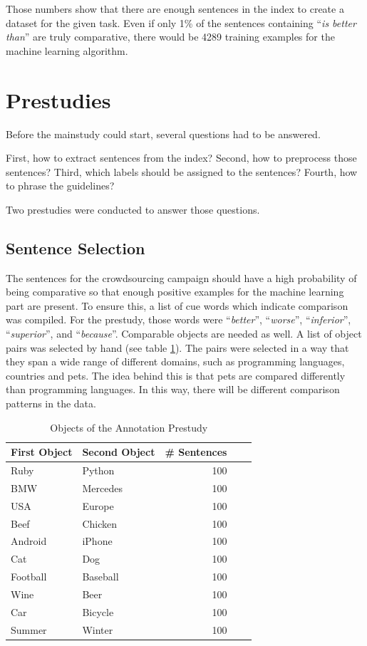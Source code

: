 Those numbers show that there are enough sentences in the index to create a dataset for the given task. Even if only 1\% of the sentences containing \enquote{\emph{is better than}} are truly comparative, there would be 4289 training examples for the machine learning algorithm.


\section{Prestudies}
Before the mainstudy could start, several questions had to be answered.

First, how to extract sentences from the index? Second, how to preprocess those sentences? Third, which labels should be assigned to the sentences? Fourth, how to phrase the guidelines?

Two prestudies were conducted to answer those questions.



\subsection{Sentence Selection}
The sentences for the crowdsourcing campaign should have a high probability of being comparative so that enough positive examples for the machine learning part are present. To ensure this, a list of cue words which indicate comparison was compiled. For the prestudy, those words were \enquote{\emph{better}}, \enquote{\emph{worse}}, \enquote{\emph{inferior}}, \enquote{\emph{superior}}, and \enquote{\emph{because}}. Comparable objects are needed as well. A list of object pairs was selected by hand (see table \ref{tbl:prestudy-objects}). The pairs were selected in a way that they span a wide range of different domains, such as programming languages, countries and pets. The idea behind this is that pets are compared differently than programming languages. In this way, there will be different comparison patterns in the data.

\begin{table}[h]
\centering
\caption{Objects of the Annotation Prestudy}
\label{tbl:prestudy-objects}
\begin{tabular}{@{}llrrr@{}}
\toprule
First Object & Second Object      & \# Sentences                             \\ \midrule
Ruby    & Python    & 100      \\
BMW    & Mercedes    & 100  \\
USA & Europe & 100 \\
Beef & Chicken & 100   \\
Android & iPhone    &   100  \\
Cat & Dog      &     100  \\ 
Football & Baseball   &  100 \\ 
Wine & Beer  & 100  \\
Car & Bicycle & 100 \\
Summer & Winter &  100\\
\bottomrule  
                               
\end{tabular}
\end{table}

